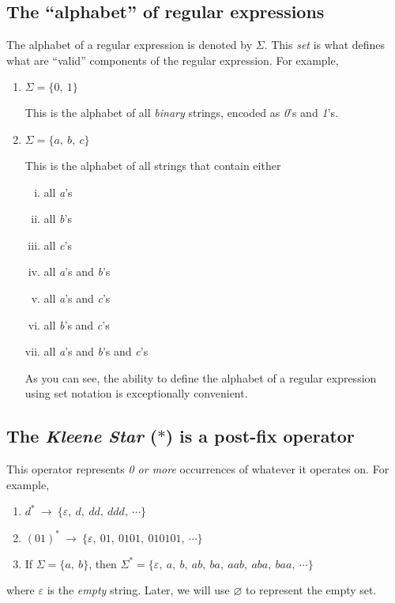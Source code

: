 \documentclass[12pt, leqno]{article} %
\begin{document}
\subsection{The ``alphabet'' of regular expressions}
The alphabet of a regular expression is denoted by $\Sigma$.  This \emph{set} is what
defines what are ``valid'' components of the regular expression.  For example,
\begin{enumerate}
  \item $\Sigma = \{0,~1\}$

  This is the alphabet of all \emph{binary} strings, encoded as \emph{0}'s and \emph{1}'s.

  \item $\Sigma = \{a,~b,~c\}$

  This is the alphabet of all strings that contain either
  \begin{enumerate}[i)]
    \item all \emph{a}'s
    \item all \emph{b}'s
    \item all \emph{c}'s
    \item all \emph{a}'s and \emph{b}'s
    \item all \emph{a}'s and \emph{c}'s
    \item all \emph{b}'s and \emph{c}'s
    \item all \emph{a}'s and \emph{b}'s and \emph{c}'s
  \end{enumerate}
As you can see, the ability to define the alphabet of a regular expression using set
notation is exceptionally convenient.
\end{enumerate}

\subsection{The \emph{Kleene Star} ($\ast$) is a post-fix operator}

This operator represents \emph{0 or more} occurrences of whatever it operates on.  For example,
\begin{enumerate}
  \item $d^\ast~\longrightarrow~\{\varepsilon,~d,~dd,~ddd,~\cdots\}$
  \item $(01)^\ast~\longrightarrow~\{\varepsilon,~01,~0101,~010101,~\cdots\}$
  \item If $\Sigma = \{a,~b\}$, then $\Sigma^\ast = \{\varepsilon,~a,~b,~ab,~ba,~aab,~aba,~baa,~\cdots\}$
\end{enumerate}
where $\varepsilon$ is the \emph{empty} string.  Later, we will use $\varnothing$ to represent the empty set.
\end{document}
